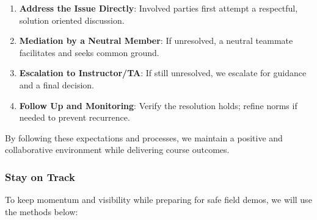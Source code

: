 \documentclass{article}
\begin{document}
\begin{enumerate}
  \item \textbf{Address the Issue Directly}: Involved parties first attempt a
        respectful, solution oriented discussion.
  \item \textbf{Mediation by a Neutral Member}: If unresolved, a neutral
        teammate facilitates and seeks common ground.
  \item \textbf{Escalation to Instructor/TA}: If still unresolved, we escalate
        for guidance and a final decision.
  \item \textbf{Follow Up and Monitoring}: Verify the resolution holds; refine
        norms if needed to prevent recurrence.
\end{enumerate}

By following these expectations and processes, we maintain a positive and
collaborative environment while delivering course outcomes.

\subsubsection*{\color{blue}Stay on Track}

To keep momentum and visibility while preparing for safe field demos, we will
use the methods below:
\end{document}
